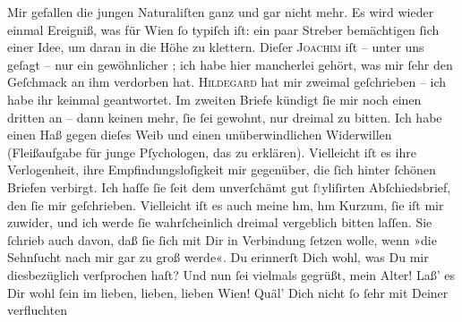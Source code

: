 \begin{ledgroupsized}[t]{13cm}
           \pstart
           Mir gefallen die jungen Naturaliſten ganz und gar nicht mehr. Es wird wieder einmal
               Ereigniß, was für Wien ſo \strikeout{\textcolor{gray}{t}\textcolor{gray}{×}} typiſch iſt: ein paar Streber bemächtigen ſich einer Idee, um daran in die
               Höhe zu klettern. Dieſer \textsc{Joachim} iſt – unter uns geſagt – nur ein gewöhnlicher \label{K_L02661-5v}\label{K_L02661-5h}; ich habe
               hier mancherlei gehört, was mir ſehr den Geſchmack an ihm verdorben hat.\pend
           \pstart
           \textsc{Hildegard} hat mir zweimal geſchrieben –  ich habe
               ihr keinmal geantwortet. Im zweiten Briefe kündigt ſie mir noch einen dritten an –
               dann keinen mehr, ſie ſei gewohnt, nur dreimal zu bitten. Ich habe einen Haß gegen
               dieſes Weib und einen
               unüberwindlichen Widerwillen (Fleißaufgabe für junge Pſychologen, das zu erklären).
                  {\pb}Vielleicht iſt es ihre Verlogenheit, ihre
               Empfindungsloſigkeit mir gegenüber, die ſich hinter ſchönen Briefen verbirgt. Ich
               haſſe ſie ſeit dem unverſchämt gut ſ\textcolor{gray}{t}yliſirten Abſchiedsbrief, den
               ſie mir geſchrieben. Vielleicht iſt es auch meine {\dotsfour} hm, hm
                  {\dotsfour} Kurzum, ſie iſt mir zuwider, und ich werde ſie
               wahrſcheinlich dreimal vergeblich bitten laſſen. Sie ſchrieb auch davon, daß ſie ſich
               mit Dir in Verbindung ſetzen wolle, wenn »die Sehnſucht nach  mir gar zu groß werde«. Du erinnerſt Dich wohl, was Du mir diesbezüglich
               verſprochen haſt? {\dotsfour}\pend
           \pstart
           Und nun ſei vielmals gegrüßt, mein Alter! Laß’ es Dir wohl ſein im lieben, lieben,
               lieben Wien! Quäl’ {\pb}Dich nicht ſo ſehr mit Deiner verfluchten

\end{ledgroupsized}
